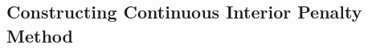 


\subsection{Constructing Continuous Interior Penalty Method}%
\label{sub:constructing_continious_interior_penalty_method}

